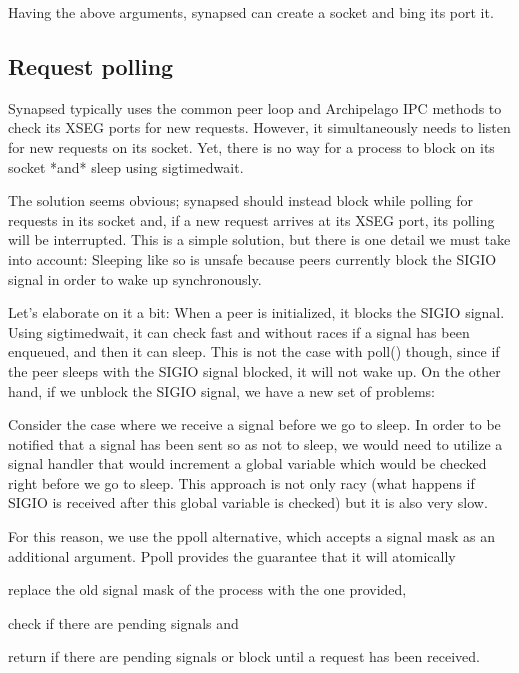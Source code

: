 Having the above arguments, synapsed can create a socket and bing its port it.  

\subsection{Request polling}\label{sec:poll-synapsed}

Synapsed typically uses the common peer loop and Archipelago IPC methods to 
check its XSEG ports for new requests. However, it simultaneously needs to 
listen for new requests on its socket. Yet, there is no way for a process to 
block on its socket *and* sleep using sigtimedwait.

The solution seems obvious; synapsed should instead block while polling for 
requests in its socket and, if a new request arrives at its XSEG port, its 
polling will be interrupted. This is a simple solution, but there is one
detail we must take into account: Sleeping like so is unsafe because peers 
currently block the SIGIO signal in order to wake up synchronously.

Let's elaborate on it a bit: When a peer is initialized, it blocks the SIGIO 
signal. Using sigtimedwait, it can check fast and without races if a signal has 
been enqueued, and then it can sleep. This is not the case with poll() though, 
since if the peer sleeps with the SIGIO signal blocked, it will not wake up.  
On the other hand, if we unblock the SIGIO signal, we have a new set of 
problems:

Consider the case where we receive a signal before we go to sleep. In order to 
be notified that a signal has been sent so as not to sleep, we would need to 
utilize a signal handler that would increment a global variable which would be 
checked right before we go to sleep. This approach is not only racy (what 
happens if SIGIO is received after this global variable is checked) but it is 
also very slow.

For this reason, we use the ppoll alternative, which accepts a signal mask as 
an additional argument. Ppoll provides the guarantee that it will atomically 
\begin{inparaenum}[i.]
\item replace the old signal mask of the process with the one provided,
\item check if there are pending signals and
\item return if there are pending signals or block until a request has been 
	received.
\end{inparaenum}

